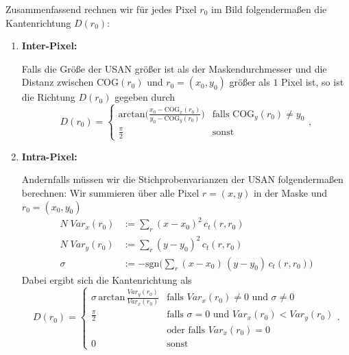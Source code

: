 \documentclass[a4paper, 11pt]{report}
\theoremstyle{definition}
\begin{document}
			Zusammenfassend rechnen wir für jedes Pixel $r_0$ im Bild folgendermaßen die Kantenrichtung $D(r_0)$:
			\begin{enumerate}
				\item \textbf{Inter-Pixel:}

				\noindent Falls die Größe der USAN größer ist als der Maskendurchmesser und die Distanz zwischen $\text{COG}(r_0)$ und $r_0=(x_0, y_0)$ größer als $1$ Pixel ist, so ist die Richtung $D(r_0)$ gegeben durch
				$$ D(r_0) = \begin{cases}
					\text{arctan}\bigg(
						\frac{x_0 - \text{COG}_x(r_0)}
						{y_0 - \text{COG}_y(r_0)}
					\bigg) & \text{falls } \text{COG}_y(r_0) \neq y_0 \\
					
					\frac{\pi}{2} & \text{sonst}
				\end{cases}, $$

				\item \textbf{Intra-Pixel:}
				
				\noindent Andernfalls müssen wir die Stichprobenvarianzen der USAN folgendermaßen berechnen: Wir summieren über alle Pixel $r = (x, y)$ in der Maske und $r_0 = (x_0, y_0)$
				\begin{align*}
					N \; Var_x(r_0) &:= \sum_r (x-x_0)^2 \, c_t(r,r_0) \\
					N \; Var_y(r_0) &:= \sum_r (y-y_0)^2 \, c_t(r,r_0) \\
					\sigma 	&:= -\text{sgn}\bigg(\sum_r (x-x_0) \, (y-y_0) \, c_t(r,r_0)\bigg)
				\end{align*}
				Dabei ergibt sich die Kantenrichtung als
				$$ D(r_0) = \begin{cases}
						\sigma \, \text{arctan} \, \frac{Var_y(r_0)}{Var_x(r_0)} 	&	\text{falls } Var_x(r_0) \neq 0 \text{ und } \sigma \neq 0 \\
						\frac{\pi}{2}												&	\text{falls } \sigma = 0 \text{ und } Var_x(r_0) < Var_y(r_0)\\
						& \text{oder falls } Var_x(r_0) = 0\\
						0												&	\text{sonst}
					\end{cases}.$$
			\end{enumerate}
\end{document}
